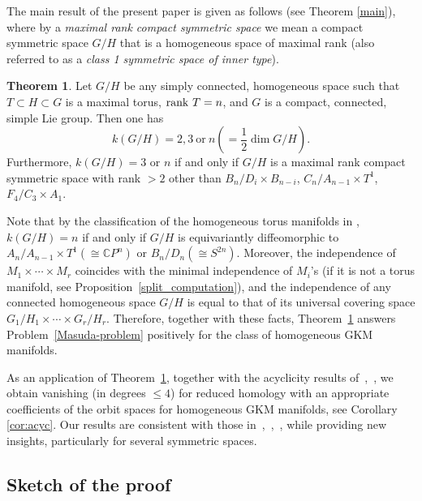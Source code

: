\documentclass{amsart}
\theoremstyle{definition}
\newcounter{thmMaincounter}
\newtheorem{theoremM}[thmMaincounter]{Theorem}
\theoremstyle{remark}
\numberwithin{equation}{section}
\begin{document}
The main result of the present paper is given as follows (see Theorem \ref{main}), where by a {\it maximal rank compact symmetric space} we mean a compact symmetric space $G/H$ that is a homogeneous space of maximal rank (also referred to as a {\it class 1 symmetric space of inner type}).
\begin{theoremM}\label{thmM:mp}
Let $G/H$ be any simply connected, homogeneous space such that $T\subset H\subset G$ is a maximal torus, ${\rm rank}\ T=n$, and $G$ is a compact, connected, simple Lie group.
Then one has 
\[
k(G/H)=2,3\ \text{or}\ n(=\frac{1}{2}\dim G/H).
\]
Furthermore, 
$k(G/H) = 3$ or $n$ if and only if $G/H$ is a maximal rank compact symmetric space with rank $>2$ other than $B_{n}/D_{i}\times B_{n-i}$, $C_{n}/A_{n-1}\times T^{1}$, $F_{4}/C_{3}\times A_{1}$.
\end{theoremM}
Note that by the classification of the homogeneous torus manifolds in \cite{Ku09}, $k(G/H) =n$ if and only if $G/H$ is equivariantly diffeomorphic to $A_{n}/A_{n-1}\times T^{1}(\cong \mathbb{C}P^{n})$ or $B_{n}/D_{n}(\cong S^{2n})$.
Moreover, the independence of $M_{1}\times \cdots \times M_{r}$ coincides with 
the minimal independence of $M_{i}$'s (if it is not a torus manifold, see Proposition~\ref{split_computation}), and the independence of any connected homogeneous space $G/H$ is equal to that of its universal covering space $G_{1}/H_{1}\times \cdots \times G_{r}/H_{r}$.
Therefore, together with these facts, Theorem~\ref{thmM:mp} answers Problem~\ref{Masuda-problem} positively for the class of homogeneous GKM manifolds.

As an application of Theorem~\ref{thmM:mp}, together with the acyclicity results of~\cite{AMS},~\cite{AM}, we obtain vanishing (in degrees $\leq 4$) for reduced homology with an appropriate coefficients of the orbit spaces for homogeneous GKM manifolds, see Corollary \ref{cor:acyc}.
Our results are consistent with those in~\cite{S19},~\cite{S21},~\cite{BT}, while providing new insights, particularly for several symmetric spaces.

\subsection{Sketch of the proof}
\label{sect:1.2}
\end{document}

